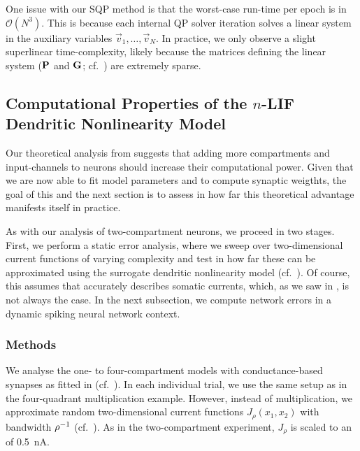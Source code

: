 One issue with our SQP method is that the worst-case run-time per epoch is in $\mathcal{O}(N^3)$.
This is because each internal QP solver iteration solves a linear system in the auxiliary variables $\vec v_1, \ldots, \vec v_N$.
In practice, we only observe a slight superlinear time-complexity, likely because the matrices defining the linear system ($\mathbf{P}$ and $\mathbf{G}$; cf.~) are extremely sparse.

\subsection{Computational Properties of the $n$-LIF Dendritic Nonlinearity Model}
\label{sec:nlif_experiment_2}

Our theoretical analysis from  suggests that adding more compartments and input-channels to \nlif neurons should increase their computational power.
Given that we are now able to fit \nlif model parameters and to compute synaptic weigthts, the goal of this and the next section is to assess in how far this theoretical advantage manifests itself in practice.

As with our analysis of two-compartment neurons, we proceed in two stages.
First, we perform a static error analysis, where we sweep over two-dimensional current functions of varying complexity and test in how far these can be approximated using the surrogate dendritic nonlinearity model \Hden (cf.~).
Of course, this assumes that \Hden accurately describes somatic currents, which, as we saw in , is not always the case.
In the next subsection, we compute network errors in a dynamic spiking neural network context.

\subsubsection{Methods}
We analyse the one- to four-compartment models with conductance-based synapses as fitted in  (cf.~).
In each individual trial, we use the same setup as in the four-quadrant multiplication example.
However, instead of multiplication, we approximate random two-dimensional current functions $J_\rho(x_1, x_2)$ with bandwidth ${\rho^{-1}}$ (cf.~).
As in the two-compartment experiment, $J_\rho$ is scaled to an \RMS of \SI{0.5}{\nano\ampere}.

